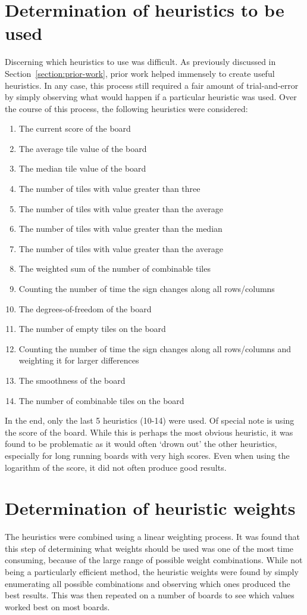 \documentclass[a4paper, 11pt, titlepage]{report}
\begin{document}
\section{Determination of heuristics to be used}
Discerning which heuristics to use was difficult. As previously discussed in Section~\ref{section:prior-work}, prior work helped immensely to create useful heuristics. In any case, this process still required a fair amount of trial-and-error by simply observing what would happen if a particular heuristic was used. Over the course of this process, the following heuristics were considered:
\begin{enumerate}
	\singlespacing
	\item The current score of the board
	\item The average tile value of the board
	\item The median tile value of the board
	\item The number of tiles with value greater than three
	\item The number of tiles with value greater than the average
	\item The number of tiles with value greater than the median
	\item The number of tiles with value greater than the average
	\item The weighted sum of the number of combinable tiles
	\item Counting the number of time the sign changes along all rows/columns
	\item The degrees-of-freedom of the board
	\item The number of empty tiles on the board
	\item Counting the number of time the sign changes along all rows/columns and weighting it for larger differences
	\item The smoothness of the board
	\item The number of combinable tiles on the board
	\onehalfspacing
\end{enumerate}

In the end, only the last 5 heuristics (10-14) were used. Of special note is using the score of the board. While this is perhaps the most obvious heuristic, it was found to be problematic as it would often `drown out' the other heuristics, especially for long running boards with very high scores. Even when using the logarithm of the score, it did not often produce good results.

\section{Determination of heuristic weights}
The heuristics were combined using a linear weighting process. It was found that this step of determining what weights should be used was one of the most time consuming, because of the large range of possible weight combinations. While not being a particularly efficient method, the heuristic weights were found by simply enumerating all possible combinations and observing which ones produced the best results. This was then repeated on a number of boards to see which values worked best on most boards.
\end{document}
